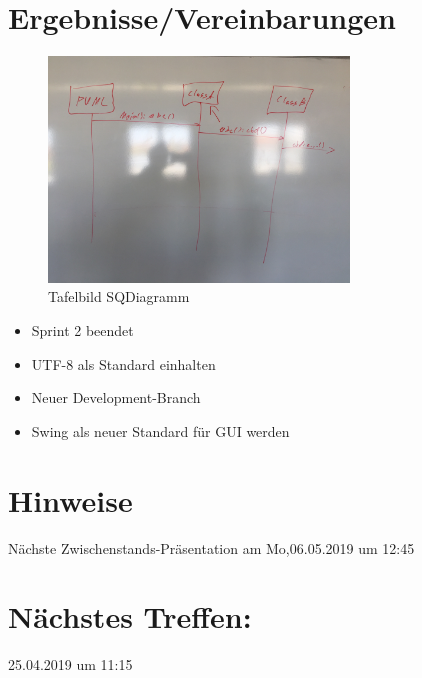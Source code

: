 \section*{Ergebnisse/Vereinbarungen}
\begin{figure}
	\centering
	\includegraphics[width=8cm]{bilderMinutes/sequenceDiagrammFkt_Tafel}
	\caption{Tafelbild SQDiagramm}
\end{figure}
\begin{itemize}
\item Sprint 2 beendet\\
\item UTF-8 als Standard einhalten\\
\item Neuer Development-Branch \\
\item Swing als neuer Standard für GUI werden\\
\end{itemize}
\section*{Hinweise}
Nächste Zwischenstands-Präsentation am Mo,06.05.2019 um 12:45
\section*{Nächstes Treffen:}
25.04.2019 um 11:15